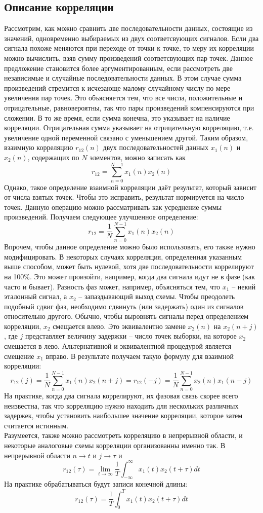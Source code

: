\documentclass{article}
\begin{document}
\subsection{Описание корреляции}
\noindent Рассмотрим, как можно сравнить две последовательности данных, состоящие из значений, одновременно выбираемых из двух соответсвующих сигналов. Если два сигнала похоже меняются при переходе от точки к точке, то меру их корреляции можно вычислить, взяв сумму произведений соответсвующих пар точек. Данное предложение становится более аргументированным, если рассмотреть две независимые и случайные последовательности данных. В этом случае сумма произведений стремится к исчезающе малому случайному числу по мере увеличения пар точек. Это объясняется тем, что все числа, положительные и отрицательные, равновероятны, так что пары произведений компенсируются при сложении. В то же время, если сумма конечна, это указывает на наличие корреляции. Отрицательная сумма указывает на отрицательную корреляцию, т.е. увеличение одной переменной связано с уменьшением другой. Таким образом, взаимную корреляцию $r_{12}(n)$ двух последовательностей данных $x_1(n)$ и $x_2(n)$, содержащих по $N$ элементов, можно записать как
$$r_{12}=\sum_{n=0}^{N-1}x_1(n)x_2(n)$$
Однако, такое определение взаимной корреляции даёт результат, который зависит от числа взятых точек. Чтобы это исправить, результат нормируется на число точек. Данную операцию можно рассматривать как усреднение суммы произведений. Получаем следующее улучшенное определение:
$$r_{12}=\frac{1}{N}\sum_{n=0}^{N-1}x_1(n)x_2(n)$$
Впрочем, чтобы данное определение можно было использовать, его также нужно модифицировать. В некоторых случаях корреляция, определенная указанным выше способом, может быть нулевой, хотя две последовательности коррелируют на 100\%. Это может произойти, например, когда два сигнала идут не в фазе (как часто и бывает). Разность фаз может, например, объясняться тем, что $x_1$ -- некий эталонный сигнал, а $x_2$ -- запаздывающий выход схемы. Чтобы преодолеть подобный сдвиг фаз, необходимо сдвинуть (или задержать) один из сигналов относительно другого. Обычно, чтобы выровнять сигналы перед определением корреляции, $x_2$ смещается влево. Это эквивалентно замене $x_2(n)$ на $x_2(n+j)$, где $j$ представляет величину задержки -- число точек выборки, на которое $x_2$ смещается в лево. Альтернативной и эквивалентной процедурой является смещение $x_1$ вправо. В результате получаем такую формулу для взаимной корреляции: 
$$r_{12}(j)=\frac{1}{N} \sum_{n=0}^{N-1}x_1(n)x_2(n+j)=r_{12}(-j)=\frac{1}{N}\sum_{n=0}^{N-1}x_2(n)x_1(n-j)$$
На практике, когда два сигнала коррелируют, их фазовая связь скорее всего неизвестна, так что корреляцию нужно находить для нескольких различных задержек, чтобы установить наибольшее значение корреляции, которое затем считается истинным.
\\
\noindent Разумеется, также можно рассмотреть корреляцию в непрерывной области, и некоторые аналоговые схемы корреляции организованны именно так. В непрерывной области $n \rightarrow t$ и $j \rightarrow \tau$ и 
$$r_{12}(\tau)= \lim_{t \rightarrow \infty} \frac{1}{T} \int_{-\infty}^\infty x_1(t) x_2(t+\tau) dt$$
На практике обрабатываться будут записи конечной длины:
$$r_{12}(\tau)=\frac{1}{T} \int_0^{T} x_1(t) x_2(t+\tau)dt$$
\end{document}
